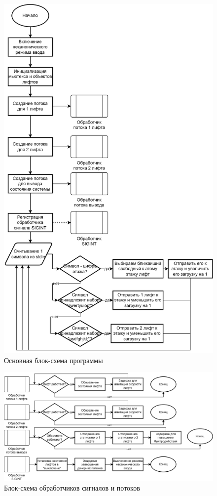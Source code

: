 \begin{figure}[H]
    \centering
    \includegraphics[width=0.75\linewidth]{images/lab2_block_scheme.drawio.png}
    \caption{Основная блок-схема программы}
    \label{fig:flowchart}
\end{figure}

\begin{figure}[H]
    \centering
    \includegraphics[width=0.9\linewidth]{images/lab2_handlers_scheme.drawio.png}
    \caption{Блок-схема обработчиков сигналов и потоков}
    \label{fig:handlers_flowchart}
\end{figure}

